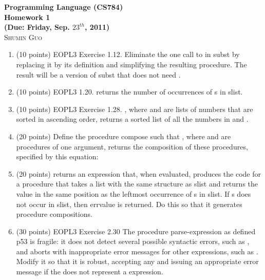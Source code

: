 \documentclass{article}
\newcommand{\ttt}[1]{\ttfamily\selectfont{#1}\normalfont}
\begin{document}
\begin{center}
\textbf{\large{
Programming Language (CS784) \\
Homework 1 \\
(Due: Friday, Sep. $23^{th}$, 2011) \\}}
\textsc{\Large{Shumin Guo}}
\end{center}

\begin{enumerate}
  \item (10 points) EOPL3 Exercise 1.12. Eliminate the one call to
    \ttt{subst-in-s-exp} in subst by replacing it by its definition and
    simplifying the resulting procedure. The result will be a version
    of subst that does not need \ttt{subst-in-s-exp}. 
\item (10 points) EOPL3 1.20.  \ttt{(count-occurrences s slist)} returns the
  number of occurrences of s in slist.
\item (10 points) EOPL3 Exercise 1.28. \ttt{(merge lon1 lon2)}, where \ttt{lon1}
  and \ttt{lon2} are lists of numbers that are sorted in ascending order,
  returns a sorted list of all the numbers in \ttt{lon1} and \ttt{lon2}. 
\item (20 points) Define the procedure compose such that \ttt{(compose p1
  p2)}, where \ttt{p1} and \ttt{p2} are procedures of one argument, returns the
  composition of these procedures, specified by this equation: \\
  \ttt{
  ((compose p1 p2) x) = (p1 (p2 x)) \\
  > ((compose car cdr) '(a b c d)) \\
  b}
\item (20 points) \ttt{(car\&cdr s slist errvalue)} returns an expression
  that, when evaluated, produces the code for a procedure that takes a
  list with the same structure as slist and returns the value in the
  same position as the leftmost occurrence of s in slist. If s does
  not occur in slist, then errvalue is returned. Do this so that it
  generates procedure compositions. \\
  \ttt{
  > (car\&cdr 'a '(a b c) 'fail) \\ 
  car \\
  > (car\&cdr 'c '(a b c) 'fail) \\ 
  (compose car (compose cdr cdr))  \\
  > (car\&cdr 'dog '(cat lion (fish dog ()) pig) 'fail) \\ 
  (compose car (compose cdr (compose car (compose cdr cdr)))) \\ 
  > (car\&cdr 'a '(b c) 'fail) \\
  fail }

\item (30 points) EOPL3 Exercise 2.30 The procedure parse-expression
  as defined p53 is fragile: it does not detect several possible
  syntactic errors, such as \ttt{(a b c)}, and aborts with
  inappropriate error messages for other expressions, such as
  \ttt{(lambda)}. Modify it so that it is robust, accepting any
  \ttt{s-exp} and issuing an appropriate error message if the
  \ttt{s-exp} does not represent a \ttt{lambda-calculus} expression.

\end{enumerate}
\end{document}
